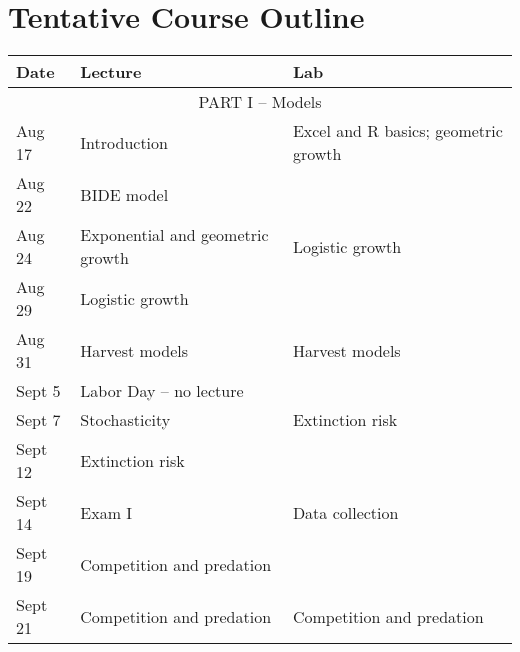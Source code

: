 \documentclass[12pt]{article}
\begin{document}
\clearpage

\section*{\normalsize Tentative Course Outline}

\begin{center}
\begin{tabular}[c]{lll}
\hline \hline
{\bf Date} & {\bf Lecture}                      & {\bf Lab}                      \\
\hline
           \multicolumn{3}{c}{PART I -- Models}                                        \\
\hline
\hline
Aug 17     & Introduction                       & Excel and R basics; geometric growth \\
\hline
Aug 22     & BIDE model                         &                                      \\
Aug 24     & Exponential and geometric growth   & Logistic growth                      \\
\hline
Aug 29     & Logistic growth                    &                                      \\
Aug 31     & Harvest models                     & Harvest models                       \\
\hline
Sept 5     & Labor Day -- no lecture            &                                      \\
Sept 7     & Stochasticity                      & Extinction risk                      \\
\hline
Sept 12    & Extinction risk                    &                                      \\
Sept 14    & Exam I                             & Data collection                      \\
\hline
Sept 19    & Competition and predation          &                                      \\
Sept 21    & Competition and predation          & Competition and predation            \\

\end{tabular}
\end{center}
\end{document}
